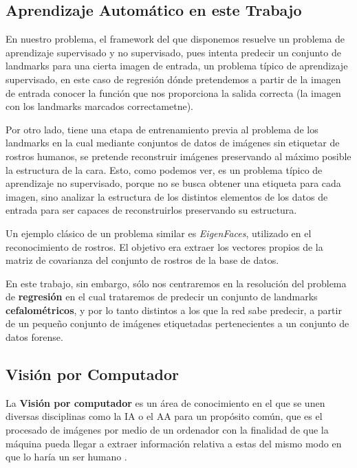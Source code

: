     \subsection{Aprendizaje Automático en este Trabajo}
        \noindent En nuestro problema, el framework del que disponemos resuelve un problema de aprendizaje supervisado y no supervisado, pues intenta predecir un conjunto de landmarks para una cierta imagen de entrada, un problema típico de aprendizaje supervisado, en este caso de regresión dónde pretendemos a partir de la imagen de entrada conocer la función que nos proporciona la salida correcta (la imagen con los landmarks marcados correctametne).

        \medskip

        \noindent Por otro lado, tiene una etapa de entrenamiento previa al problema de los landmarks en la cual mediante conjuntos de datos de imágenes sin etiquetar de rostros humanos, se pretende reconstruir imágenes preservando al máximo posible la estructura de la cara. Esto, como podemos ver, es un problema típico de aprendizaje no supervisado, porque no se busca obtener una etiqueta para cada imagen, sino analizar la estructura de los distintos elementos de los datos de entrada para ser capaces de reconstruirlos preservando su estructura. 
        
        \medskip
        
        \noindent Un ejemplo clásico de un problema similar es \textit{EigenFaces}, utilizado en el reconocimiento de rostros. El objetivo era extraer los vectores propios de la matriz de covarianza del conjunto de rostros de la base de datos.

        \medskip

        \noindent En este trabajo, sin embargo, sólo nos centraremos en la resolución del problema de \textbf{regresión} en el cual trataremos de predecir un conjunto de landmarks \textbf{cefalométricos}, y por lo tanto distintos a los que la red sabe predecir, a partir de un  pequeño conjunto de imágenes etiquetadas pertenecientes a un conjunto de datos forense.

    \subsection{Visión por Computador}
        \noindent La \textbf{Visión por computador} es un área de conocimiento en el que se unen diversas disciplinas como la IA o el AA para un propósito común, que es el procesado de imágenes por medio de un ordenador con la finalidad de que la máquina pueda llegar a extraer información relativa a estas del mismo modo en que lo haría un ser humano \cite{rosenfeld1988computer}. 

